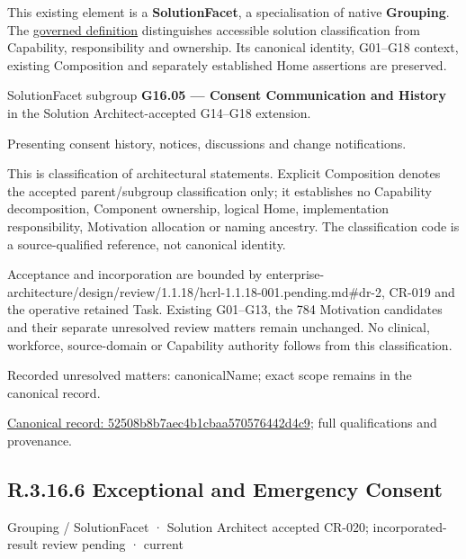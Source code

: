 This existing element is a \textbf{SolutionFacet}, a specialisation of native
\textbf{Grouping}. The \href{\detokenize{../../../../../../../governance/continuum-representation.md#solutionfacet-classification--1119-candidate}}{governed definition}
distinguishes accessible solution classification from Capability, responsibility
and ownership. Its canonical identity, G01–G18 context, existing Composition
and separately established Home assertions are preserved.



SolutionFacet subgroup \textbf{G16.05 — Consent Communication and History} in the Solution Architect-accepted G14–G18 extension.



Presenting consent history, notices, discussions and change notifications.



This is classification of architectural statements. Explicit Composition denotes the accepted parent/subgroup classification only; it establishes no Capability decomposition, Component ownership, logical Home, implementation responsibility, Motivation allocation or naming ancestry. The classification code is a source-qualified reference, not canonical identity.



Acceptance and incorporation are bounded by enterprise-architecture/design/review/1.1.18/hcrl-1.1.18-001.pending.md\#dr-2, CR-019 and the operative retained Task. Existing G01–G13, the 784 Motivation candidates and their separate unresolved review matters remain unchanged. No clinical, workforce, source-domain or Capability authority follows from this classification.


{\small Recorded unresolved matters: canonicalName; exact scope remains in the canonical record.}\par
{\footnotesize \href{../../../../../../../continuum/grouping/52508b8b7aec4b1cbaa570576442d4c9.md}{Canonical record: 52508b8b7aec4b1cbaa570576442d4c9}; full qualifications and provenance.}\par
\subsection*{R.3.16.6 Exceptional and Emergency Consent}
\label{navigation:R.3.16.6}

\label{element:25bc65e773d64ecf9b71ae4f92ed57e1}
{\small Grouping / SolutionFacet · Solution Architect accepted CR-020; incorporated-result review pending · current}\par

